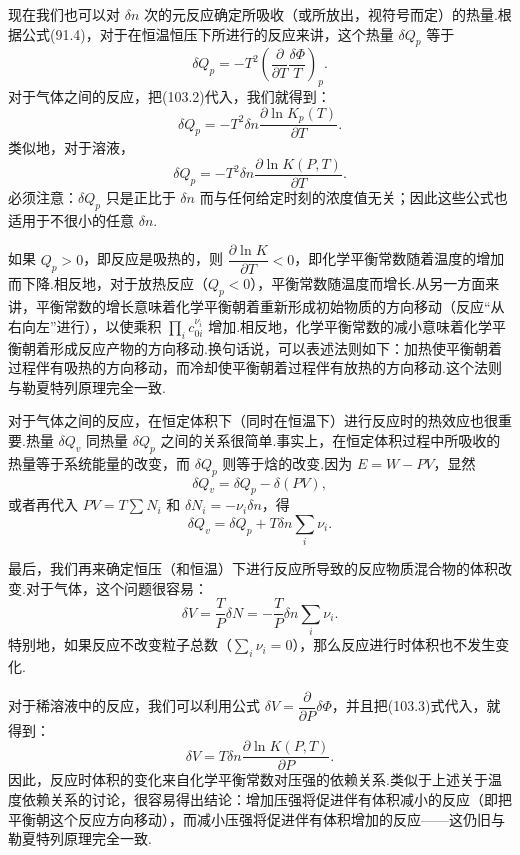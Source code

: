 现在我们也可以对 $\delta n$ 次的元反应确定所吸收（或所放出，视符号而定）的热量.根据公式(91.4)，对于在恒温恒压下所进行的反应来讲，这个热量 $\delta Q_p$ 等于
\begin{equation*}
  \delta Q_p=-T^2\left(\frac{\partial}{\partial T}
  \frac{\delta\Phi}{T}\right)_p.
\end{equation*}
对于气体之间的反应，把(103.2)代入，我们就得到：
\begin{equation}
  \delta Q_p=-T^2\delta n\frac{\partial\ln K_p(T)}{\partial T}.
\end{equation}
类似地，对于溶液，
\begin{equation}
  \delta Q_p=-T^2\delta n\frac{\partial\ln K(P,T)}{\partial T}.
\end{equation}
必须注意：$\delta Q_p$ 只是正比于 $\delta n$ 而与任何给定时刻的浓度值无关；因此这些公式也适用于不很小的任意 $\delta n$.

如果 $Q_p>0$，即反应是吸热的，则 $\dfrac{\partial\ln K}{\partial T}<0$，即化学平衡常数随着温度的增加而下降.相反地，对于放热反应（$Q_p<0$），平衡常数随温度而增长.从另一方面来讲，平衡常数的增长意味着化学平衡朝着重新形成初始物质的方向移动（反应“从右向左”进行），以使乘积 $\prod\limits_ic_{0i}^{\nu_i}$ 增加.相反地，化学平衡常数的减小意味着化学平衡朝着形成反应产物的方向移动.换句话说，可以表述法则如下：加热使平衡朝着过程伴有吸热的方向移动，而冷却使平衡朝着过程伴有放热的方向移动.这个法则与勒夏特列原理完全一致.

对于气体之间的反应，在恒定体积下（同时在恒温下）进行反应时的热效应也很重要.热量 $\delta Q_v$ 同热量 $\delta Q_p$ 之间的关系很简单.事实上，在恒定体积过程中所吸收的热量等于系统能量的改变，而 $\delta Q_p$ 则等于焓的改变.因为 $E=W-PV$，显然
\begin{equation*}
  \delta Q_v=\delta Q_p-\delta(PV),
\end{equation*}
或者再代入 $PV=T\sum N_i$ 和 $\delta N_i=-\nu_i\delta n$，得
\begin{equation}
  \delta Q_v=\delta Q_p+T\delta n\sum_i\nu_i.
\end{equation}

最后，我们再来确定恒压（和恒温）下进行反应所导致的反应物质混合物的体积改变.对于气体，这个问题很容易：
\begin{equation}
  \delta V=\frac TP\delta N=-\frac TP\delta n\sum_i\nu_i.
\end{equation}
特别地，如果反应不改变粒子总数（$\sum\limits_i\nu_i=0$），那么反应进行时体积也不发生变化.

对于稀溶液中的反应，我们可以利用公式 $\delta V=\dfrac{\partial}{\partial P}\delta\Phi$，并且把(103.3)式代入，就得到：
\begin{equation}
  \delta V=T\delta n\frac{\partial\ln K(P,T)}{\partial P}.
\end{equation}
因此，反应时体积的变化来自化学平衡常数对压强的依赖关系.类似于上述关于温度依赖关系的讨论，很容易得出结论：增加压强将促进伴有体积减小的反应（即把平衡朝这个反应方向移动），而减小压强将促进伴有体积增加的反应——这仍旧与勒夏特列原理完全一致.

